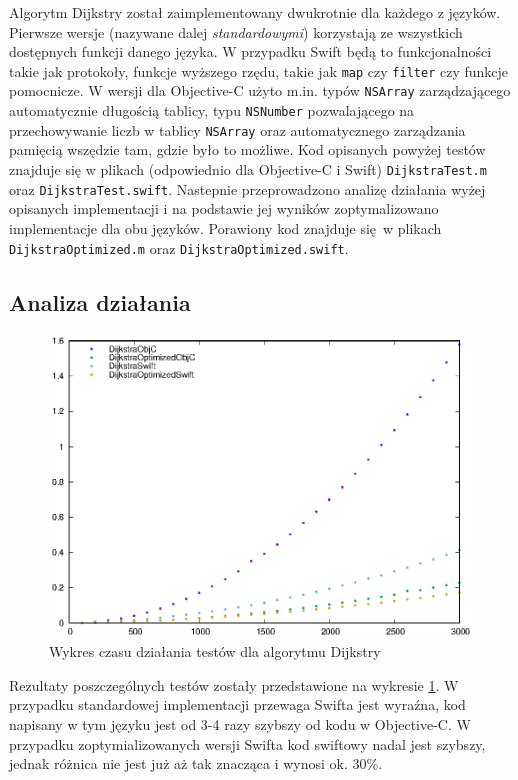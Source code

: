 \documentclass[mgr, shortabstract]{iithesis}
\newcommand{\swiftinline}[1]{
    \texttt{#1}
}
\newcommand{\objcinline}[1]{
    \texttt{#1}
}
\begin{document}
Algorytm Dijkstry został zaimplementowany dwukrotnie dla każdego z języków. Pierwsze wersje (nazywane dalej \textit{standardowymi}) korzystają ze wszystkich dostępnych funkcji danego języka. W przypadku Swift będą to funkcjonalności takie jak protokoły, funkcje wyższego rzędu, takie jak \swiftinline{map} czy \swiftinline{filter} czy funkcje pomocnicze. W wersji dla Objective-C użyto m.in. typów \objcinline{NSArray} zarządzającego automatycznie długością tablicy, typu \objcinline{NSNumber} pozwalającego na przechowywanie liczb w tablicy \objcinline{NSArray} oraz automatycznego zarządzania pamięcią wszędzie tam, gdzie było to możliwe. Kod opisanych powyżej testów znajduje się w plikach (odpowiednio dla Objective-C i Swift) \texttt{DijkstraTest.m} oraz \texttt{DijkstraTest.swift}. Nastepnie przeprowadzono analizę działania wyżej opisanych implementacji i na podstawie jej wyników zoptymalizowano implementacje dla obu języków. Porawiony kod znajduje się w plikach \texttt{DijkstraOptimized.m} oraz \texttt{DijkstraOptimized.swift}.

\subsection{Analiza działania}

\begin{figure}
    \includegraphics{plots/Dijkstra}
    \caption{Wykres czasu działania testów dla algorytmu Dijkstry}
    \label{p:dijkstra}
\end{figure}

Rezultaty poszczególnych testów zostały przedstawione na wykresie \ref{p:dijkstra}. W przypadku standardowej implementacji przewaga Swifta jest wyraźna, kod napisany w tym języku jest od 3-4 razy szybszy od kodu w Objective-C. W przypadku zoptymializowanych wersji Swifta kod swiftowy nadal jest szybszy, jednak różnica nie jest już aż tak znacząca i wynosi ok. 30\%.
\end{document}
